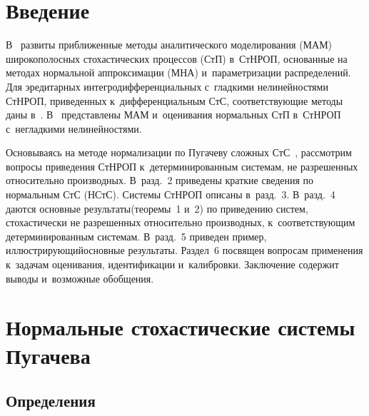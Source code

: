   
\vspace*{6pt}



\thispagestyle{headings}

\begin{multicols}{2}

\label{st\stat}

\section{Введение}


В~\cite{1-sin, 2-sin} развиты приближенные методы аналитического моделирования (МАМ) 
широкополосных стохастических процессов (СтП) в~СтНРОП, основанные на методах 
нормальной аппроксимации (МНА) и~параметризации распределений. 
Для эредитарных ин\-тег\-ро\-диф\-фе\-рен\-ци\-аль\-ных с~гладкими нелинейностями 
\mbox{СтНРОП}, приведенных к~дифференциальным СтС, 
со\-от\-вет\-ст\-ву\-ющие методы даны в~\cite{3-sin, 4-sin}. В~\cite{5-sin} 
пред\-став\-ле\-ны МАМ и~оценивания нормальных СтП в~СтНРОП с~негладкими нелинейностями.

Основываясь на методе нормализации по Пугачеву слож\-ных СтС~\cite{6-sin, 7-sin, 8-sin, 9-sin}, 
рассмотрим вопросы приведения СтНРОП 
к~детерминированным сис\-те\-мам, не разрешенных относительно производных.
В~разд.~2 приведены краткие сведения по нормальным СтС (НСтС). 
Сис\-те\-мы \mbox{СтНРОП} описаны в~разд.~3. В~разд.~4 даются основные результаты\linebreak (теоремы~1 и~2) 
по приведению сис\-тем, стохасти\-чески не разрешенных относительно производных, 
к~со\-от\-вет\-ст\-ву\-ющим детерминированным сис\-те\-мам. В~разд.~5 
приведен пример, ил\-люст\-ри\-ру\-ющий\linebreak основные результаты. Раздел~6 
посвящен вопросам применения к~задачам оценивания, идентификации и~калибровки. 
Заключение содержит выводы и~возможные обобщения.



\section{Нормальные стохастические системы Пугачева}

\vspace*{-6pt}


\subsection{Определения} 


\end{multicols}
